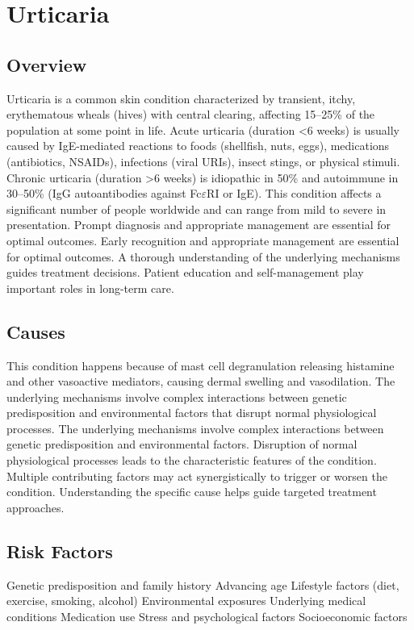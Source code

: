 \chapter{Urticaria}
\label{sec:Urticaria}

\section{Overview}
Urticaria is a common skin condition characterized by transient, itchy, erythematous wheals (hives) with central clearing, affecting 15--25\% of the population at some point in life. Acute urticaria (duration <6 weeks) is usually caused by IgE-mediated reactions to foods (shellfish, nuts, eggs), medications (antibiotics, NSAIDs), infections (viral URIs), insect stings, or physical stimuli. Chronic urticaria (duration >6 weeks) is idiopathic in 50\% and autoimmune in 30--50\% (IgG autoantibodies against Fc$\varepsilon$RI or IgE). This condition affects a significant number of people worldwide and can range from mild to severe in presentation. Prompt diagnosis and appropriate management are essential for optimal outcomes. Early recognition and appropriate management are essential for optimal outcomes. A thorough understanding of the underlying mechanisms guides treatment decisions. Patient education and self-management play important roles in long-term care.
\section{Causes}
This condition happens because of mast cell degranulation releasing histamine and other vasoactive mediators, causing dermal swelling and vasodilation. The underlying mechanisms involve complex interactions between genetic predisposition and environmental factors that disrupt normal physiological processes. The underlying mechanisms involve complex interactions between genetic predisposition and environmental factors. Disruption of normal physiological processes leads to the characteristic features of the condition. Multiple contributing factors may act synergistically to trigger or worsen the condition. Understanding the specific cause helps guide targeted treatment approaches.
\section{Risk Factors}
Genetic predisposition and family history Advancing age Lifestyle factors (diet, exercise, smoking, alcohol) Environmental exposures Underlying medical conditions Medication use Stress and psychological factors Socioeconomic factors

